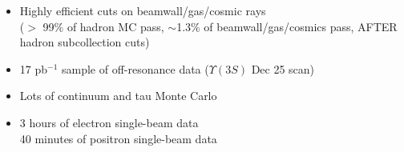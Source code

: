 
\begin{slide*}

\slideframe{}
\huge
{}

\begin{minipage}[t]{\linewidth}
\LARGE

\vspace{1 cm}

\begin{flushleft}
\begin{itemize}
  \item Highly efficient cuts on beamwall/gas/cosmic rays \\
	($>$ 99\% of hadron MC pass, $\sim$1.3\% of beamwall/gas/cosmics
	pass, AFTER hadron subcollection cuts)

\vspace{0.5 cm}

  \item 17 pb$^{-1}$ sample of off-resonance data ($\Upsilon(3S)$ Dec 25 scan)

  \item Lots of continuum and tau Monte Carlo

  \item 3 hours of electron single-beam data \\
	40 minutes of positron single-beam data

\end{itemize}
\end{flushleft}

\end{minipage}

\end{slide*}


